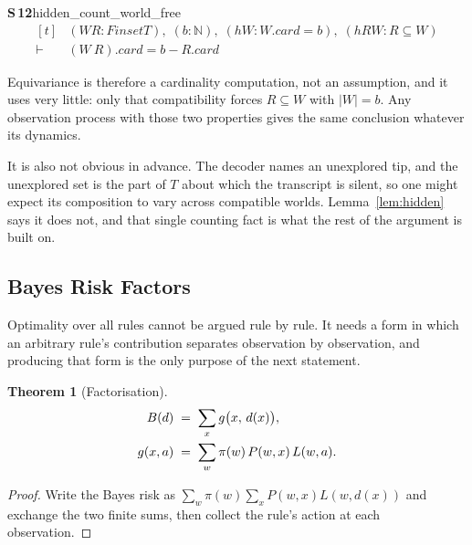 \documentclass[conference]{IEEEtran}
\newtheorem{theorem}{Theorem}
\theoremstyle{definition}
\newcommand{\lean}[1]{\textsf{\footnotesize #1}}
\begin{document}
\noindent\textbf{S\,12}\quad\lean{hidden\_count\_world\_free}
{\footnotesize\[ \begin{aligned}[t]
&(\mathit{W} \mathit{R} : \mathit{Finset} \mathit{T}),\; (\mathit{b} : \mathbb{N} ),\; (\mathit{hW} : \mathit{W}.\mathit{card} = \mathit{b}),\; (\mathit{hRW} : \mathit{R} \subseteq \mathit{W})\\
\vdash\;&(\mathit{W} \ \mathit{R}).\mathit{card} = \mathit{b} - \mathit{R}.\mathit{card}
\end{aligned} \]}


Equivariance is therefore a cardinality computation, not an assumption, and it uses very
little: only that compatibility forces $R\subseteq W$ with $|W|=b$. Any observation process
with those two properties gives the same conclusion whatever its dynamics.

It is also not obvious in advance. The decoder names an unexplored tip, and the unexplored set
is the part of $T$ about which the transcript is silent, so one might expect its composition
to vary across compatible worlds. Lemma~\ref{lem:hidden} says it does not, and that single
counting fact is what the rest of the argument is built on.

\subsection{Bayes Risk Factors}
\label{sec:bayes}

Optimality over all rules cannot be argued rule by rule. It needs a form in which an arbitrary
rule's contribution separates observation by observation, and producing that form is the only
purpose of the next statement.

\begin{theorem}[Factorisation]
\label{thm:factor}
\begin{align}
B(d)&\;=\;\sum_{x} g\bigl(x,\,d(x)\bigr),\notag\\
g(x,a)&\;=\;\sum_{w}\pi(w)\,P(w,x)\,L(w,a).
\label{eq:bayes}
\end{align}
\end{theorem}

\begin{proof}
Write the Bayes risk as $\sum_{w}\pi(w)\sum_{x}P(w,x)L(w,d(x))$ and exchange the two finite
sums, then collect the rule's action at each observation.
\end{proof}
\end{document}
